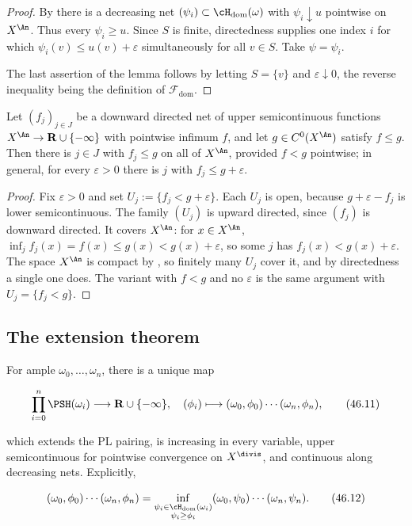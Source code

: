 \begin{proof}
By  there is a decreasing net
$(\psi_i)\subset\cH_{\mathrm{dom}}(\omega)$ with
$\psi_i\downarrow u$ pointwise on $X^{\An}$.  Thus every
$\psi_i\ge u$.  Since $S$ is finite, directedness supplies one index
$i$ for which
$\psi_i(v)\le u(v)+\varepsilon$ simultaneously for all $v\in S$.
Take $\psi=\psi_i$.

The last assertion of the lemma follows by letting
$S=\{v\}$ and $\varepsilon\downarrow0$, the reverse inequality being
the definition of $\mathcal F_{\mathrm{dom}}$.
\end{proof}

\begin{lemma}
\label{lem:ch46-dini}
Let $(f_j)_{j\in J}$ be a downward directed net of upper semicontinuous
functions $X^{\An}\to\mathbf R\cup\{-\infty\}$ with pointwise infimum
$f$, and let $g\in C^0(X^{\An})$ satisfy $f\le g$.  Then there is
$j\in J$ with $f_j\le g$ on all of $X^{\An}$, provided $f<g$
pointwise; in general, for every $\varepsilon>0$ there is $j$ with
$f_j\le g+\varepsilon$.
\end{lemma}

\begin{proof}
Fix $\varepsilon>0$ and set $U_j:=\{f_j<g+\varepsilon\}$.  Each
$U_j$ is open, because $g+\varepsilon-f_j$ is lower semicontinuous.
The family $(U_j)$ is upward directed, since $(f_j)$ is downward
directed.  It covers $X^{\An}$: for $x\in X^{\An}$,
$\inf_jf_j(x)=f(x)\le g(x)<g(x)+\varepsilon$, so some $j$ has
$f_j(x)<g(x)+\varepsilon$.  The space $X^{\An}$ is compact by
, so finitely many $U_j$ cover it,
and by directedness a single one does.  The variant with $f<g$ and no
$\varepsilon$ is the same argument with $U_j=\{f_j<g\}$.
\end{proof}

\subsection{The extension theorem}
\label{sec:ch46-extension-theorem}

\begin{theorem}\label{thm:bj-extended-energy-pairing}
For ample $\omega_0,\dots,\omega_n$, there is a unique map

\[
 \prod_{i=0}^n\PSH(\omega_i)\longrightarrow\mathbf R\cup\{-\infty\},
 \quad
 (\phi_i)\longmapsto(\omega_0,\phi_0)\cdots(\omega_n,\phi_n),
\tag{46.11}\label{eq:bj-extended-energy-map}
\]

which extends the PL pairing, is increasing in every variable, upper
semicontinuous for pointwise convergence on $X^{\divis}$, and continuous
along decreasing nets.  Explicitly,

\[
 (\omega_0,\phi_0)\cdots(\omega_n,\phi_n)
 =\inf_{\substack{\psi_i\in\cH_{\mathrm{dom}}(\omega_i)\\
                   \psi_i\geq\phi_i}}
      (\omega_0,\psi_0)\cdots(\omega_n,\psi_n).
\tag{46.12}\label{eq:bj-energy-infimum}
\]
\end{theorem}


